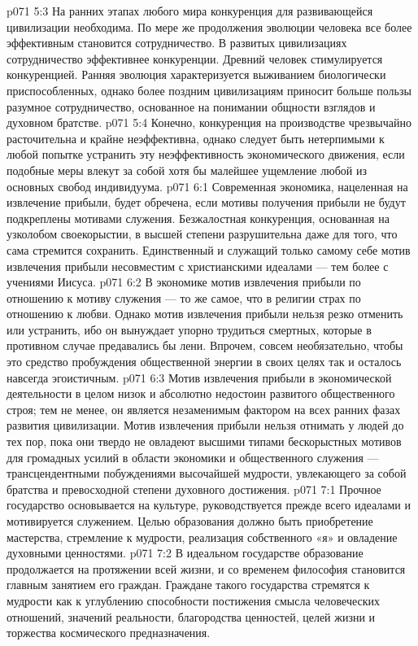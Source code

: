 \vs p071 5:3 На ранних этапах любого мира конкуренция для развивающейся цивилизации необходима. По мере же продолжения эволюции человека все более эффективным становится сотрудничество. В развитых цивилизациях сотрудничество эффективнее конкуренции. Древний человек стимулируется конкуренцией. Ранняя эволюция характеризуется выживанием биологически приспособленных, однако более поздним цивилизациям приносит больше пользы разумное сотрудничество, основанное на понимании общности взглядов и духовном братстве.
\vs p071 5:4 Конечно, конкуренция на производстве чрезвычайно расточительна и крайне неэффективна, однако следует быть нетерпимыми к любой попытке устранить эту неэффективность экономического движения, если подобные меры влекут за собой хотя бы малейшее ущемление любой из основных свобод индивидуума.
\vs p071 6:1 Современная экономика, нацеленная на извлечение прибыли, будет обречена, если мотивы получения прибыли не будут подкреплены мотивами служения. Безжалостная конкуренция, основанная на узколобом своекорыстии, в высшей степени разрушительна даже для того, что сама стремится сохранить. Единственный и служащий только самому себе мотив извлечения прибыли несовместим с христианскими идеалами --- тем более с учениями Иисуса.
\vs p071 6:2 В экономике мотив извлечения прибыли по отношению к мотиву служения --- то же самое, что в религии страх по отношению к любви. Однако мотив извлечения прибыли нельзя резко отменить или устранить, ибо он вынуждает упорно трудиться смертных, которые в противном случае предавались бы лени. Впрочем, совсем необязательно, чтобы это средство пробуждения общественной энергии в своих целях так и осталось навсегда эгоистичным.
\vs p071 6:3 Мотив извлечения прибыли в экономической деятельности в целом низок и абсолютно недостоин развитого общественного строя; тем не менее, он является незаменимым фактором на всех ранних фазах развития цивилизации. Мотив извлечения прибыли нельзя отнимать у людей до тех пор, пока они твердо не овладеют высшими типами бескорыстных мотивов для громадных усилий в области экономики и общественного служения --- трансцендентными побуждениями высочайшей мудрости, увлекающего за собой братства и превосходной степени духовного достижения.
\vs p071 7:1 Прочное государство основывается на культуре, руководствуется прежде всего идеалами и мотивируется служением. Целью образования должно быть приобретение мастерства, стремление к мудрости, реализация собственного «я» и овладение духовными ценностями.
\vs p071 7:2 В идеальном государстве образование продолжается на протяжении всей жизни, и со временем философия становится главным занятием его граждан. Граждане такого государства стремятся к мудрости как к углублению способности постижения смысла человеческих отношений, значений реальности, благородства ценностей, целей жизни и торжества космического предназначения.
